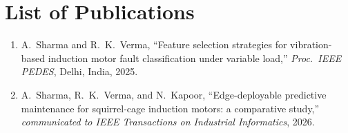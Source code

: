 \chapter{List of Publications}
\begin{enumerate}
  \item A.\ Sharma and R.\ K.\ Verma, ``Feature selection strategies for vibration-based
        induction motor fault classification under variable load,'' \emph{Proc.\ IEEE PEDES},
        Delhi, India, 2025.
  \item A.\ Sharma, R.\ K.\ Verma, and N.\ Kapoor, ``Edge-deployable predictive maintenance for
        squirrel-cage induction motors: a comparative study,'' \emph{communicated to IEEE
        Transactions on Industrial Informatics}, 2026.
\end{enumerate}
